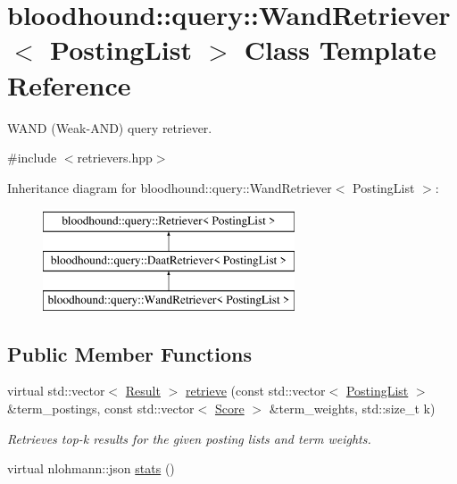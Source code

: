 \hypertarget{classbloodhound_1_1query_1_1WandRetriever}{}\section{bloodhound\+:\+:query\+:\+:Wand\+Retriever$<$ Posting\+List $>$ Class Template Reference}
\label{classbloodhound_1_1query_1_1WandRetriever}


W\+A\+ND (Weak-\/\+A\+ND) query retriever.  




{\ttfamily \#include $<$retrievers.\+hpp$>$}

Inheritance diagram for bloodhound\+:\+:query\+:\+:Wand\+Retriever$<$ Posting\+List $>$\+:\begin{figure}[H]
\begin{center}
\leavevmode
\includegraphics[height=3.000000cm]{classbloodhound_1_1query_1_1WandRetriever}
\end{center}
\end{figure}
\subsection*{Public Member Functions}
\begin{DoxyCompactItemize}
\item 
virtual std\+::vector$<$ \hyperlink{structbloodhound_1_1query_1_1Result}{Result} $>$ \hyperlink{classbloodhound_1_1query_1_1WandRetriever_a5f3068bc363c16c5b7255a925ea5af8c}{retrieve} (const std\+::vector$<$ \hyperlink{classbloodhound_1_1PostingList}{Posting\+List} $>$ \&term\+\_\+postings, const std\+::vector$<$ \hyperlink{structbloodhound_1_1Score}{Score} $>$ \&term\+\_\+weights, std\+::size\+\_\+t k)
\begin{DoxyCompactList}\small\item\em Retrieves top-\/k results for the given posting lists and term weights. \end{DoxyCompactList}\item 
virtual nlohmann\+::json \hyperlink{classbloodhound_1_1query_1_1WandRetriever_a1e593c2cddb2ca4f2415c59ca26e6a36}{stats} ()
\end{DoxyCompactItemize}


